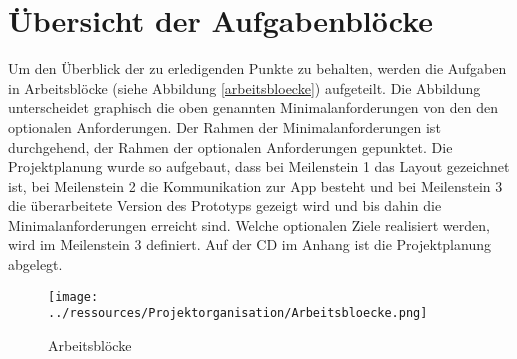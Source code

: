 \section{Übersicht der Aufgabenblöcke}

Um den Überblick der zu erledigenden Punkte zu behalten, werden die Aufgaben in Arbeitsblöcke (siehe Abbildung \ref{arbeitsbloecke}) aufgeteilt. Die Abbildung unterscheidet graphisch die oben genannten Minimalanforderungen von den den optionalen Anforderungen. Der Rahmen der Minimalanforderungen ist durchgehend, der Rahmen der optionalen Anforderungen gepunktet. Die Projektplanung wurde so aufgebaut, dass bei Meilenstein 1 das Layout gezeichnet ist, bei Meilenstein 2 die Kommunikation zur App besteht und bei Meilenstein 3 die überarbeitete Version des Prototyps gezeigt wird und bis dahin die Minimalanforderungen erreicht sind. Welche optionalen Ziele realisiert werden, wird im Meilenstein 3 definiert. Auf der CD im Anhang ist die Projektplanung abgelegt.


\begin{figure}[ht]
    \texttt{[image: ../ressources/Projektorganisation/Arbeitsbloecke.png]} 
    \caption{Arbeitsblöcke}
\end{figure}\label{arbeitsbloecke} 

